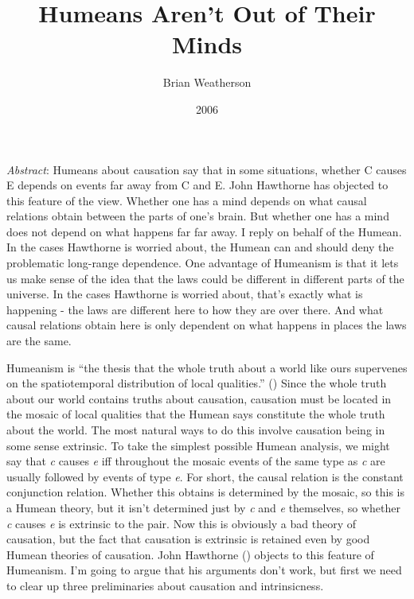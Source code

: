 \documentclass[
  11pt,
  letterpaper,
  DIV=11,
  numbers=noendperiod,
  twoside]{scrartcl}
\title{Humeans Aren't Out of Their Minds}
\author{Brian Weatherson}
\date{2006}
\renewenvironment{abstract}
 {\vspace{-1.25cm}
 \quotation\small\noindent\emph{Abstract}:}
 {\endquotation}
\begin{document}
\maketitle
\begin{abstract}
Humeans about causation say that in some situations, whether C causes E
depends on events far away from C and E. John Hawthorne has objected to
this feature of the view. Whether one has a mind depends on what causal
relations obtain between the parts of one's brain. But whether one has a
mind does not depend on what happens far far away. I reply on behalf of
the Humean. In the cases Hawthorne is worried about, the Humean can and
should deny the problematic long-range dependence. One advantage of
Humeanism is that it lets us make sense of the idea that the laws could
be different in different parts of the universe. In the cases Hawthorne
is worried about, that's exactly what is happening - the laws are
different here to how they are over there. And what causal relations
obtain here is only dependent on what happens in places the laws are the
same.
\end{abstract}


Humeanism is ``the thesis that the whole truth about a world like ours
supervenes on the spatiotemporal distribution of local qualities.''
() Since the whole truth about
our world contains truths about causation, causation must be located in
the mosaic of local qualities that the Humean says constitute the whole
truth about the world. The most natural ways to do this involve
causation being in some sense extrinsic. To take the simplest possible
Humean analysis, we might say that \emph{c} causes \emph{e} iff
throughout the mosaic events of the same type as \emph{c} are usually
followed by events of type \emph{e}. For short, the causal relation is
the constant conjunction relation. Whether this obtains is determined by
the mosaic, so this is a Humean theory, but it isn't determined just by
\emph{c} and \emph{e} themselves, so whether \emph{c} causes \emph{e} is
extrinsic to the pair. Now this is obviously a bad theory of causation,
but the fact that causation is extrinsic is retained even by good Humean
theories of causation. John Hawthorne
() objects to this feature of
Humeanism. I'm going to argue that his arguments don't work, but first
we need to clear up three preliminaries about causation and
intrinsicness.
\end{document}
